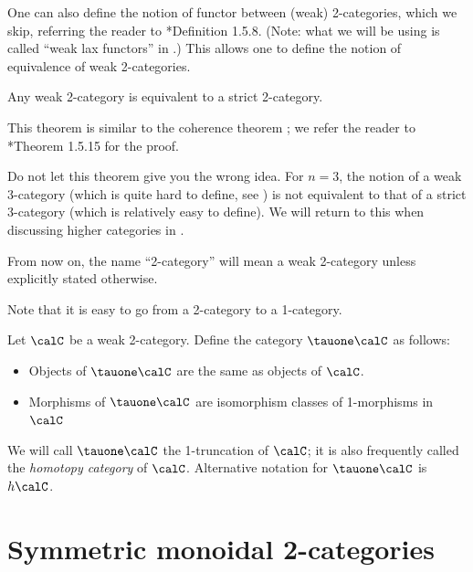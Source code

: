 One can also define the notion of functor between (weak) 2-categories,
which we skip, referring the reader to *{Definition 1.5.8}.
(Note: what we will be using is called ``weak lax functors'' in
.) This allows one to define the notion of equivalence of weak
2-categories.

\begin{theorem}\label{t:strictify-bicategories}
  Any weak 2-category is equivalent to a strict 2-category.
\end{theorem}
This theorem is similar to the coherence theorem ; we refer
the reader to *{Theorem 1.5.15} for the proof.

\begin{remark}\label{r:stictify-3-cat}
  Do not let this theorem give you the wrong idea. For $n=3$, the notion of a
  weak $3$-category (which is quite hard to define, see
  ) is not equivalent to that of a strict 3-category
  (which is relatively easy to define). We will return to this when discussing
  higher categories in .
\end{remark}


\begin{convention}
  From now on, the name ``2-category'' will mean a weak 2-category unless
  explicitly stated otherwise.
\end{convention}
Note that it is easy to go from a 2-category to a 1-category.
\begin{definition}\label{d:hC}
  Let $\calC$ be a weak 2-category. Define the category $\tauone\calC$
  as follows:
  \begin{itemize}
    \item Objects of $\tauone\calC$ are the same as objects of $\calC$.
    \item Morphisms of $\tauone\calC$ are isomorphism classes of 1-morphisms in
    $\calC$
  \end{itemize}
  We will call $\tauone\calC$ the 1-truncation of $\calC$; it is also frequently
  called the  \emph{homotopy category} of $\calC$.
  Alternative notation for $\tauone\calC$ is $h\calC$.
\end{definition}

\section{Symmetric monoidal 2-categories}\label{s:sym-mon-2cat}


